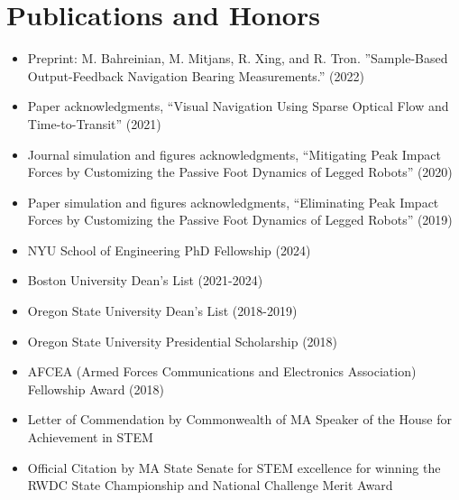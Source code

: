 \documentclass[letterpaper,11pt]{article}
\begin{document}
\section{Publications and Honors}
\begin{itemize}[leftmargin=0.15in, label={}]
  \item Preprint: M. Bahreinian, M. Mitjans, R. Xing, and R. Tron. ”Sample-Based Output-Feedback Navigation Bearing Measurements.” (2022)
  \item Paper acknowledgments, “Visual Navigation Using Sparse Optical Flow and Time-to-Transit” (2021) 
  \item Journal simulation and figures acknowledgments, “Mitigating Peak Impact Forces by Customizing the Passive Foot Dynamics of Legged Robots” (2020) 
  \item Paper simulation and figures acknowledgments, “Eliminating Peak Impact Forces by Customizing the Passive Foot Dynamics of Legged Robots” (2019) 
  \item NYU School of Engineering PhD Fellowship (2024) 
  \item Boston University Dean's List (2021-2024) 
  \item Oregon State University Dean's List (2018-2019) 
  \item Oregon State University Presidential Scholarship (2018) 
  \item AFCEA (Armed Forces Communications and Electronics Association) Fellowship Award (2018) 
  \item Letter of Commendation by Commonwealth of MA Speaker of the House for Achievement in STEM 
  \item Official Citation by MA State Senate for STEM excellence for winning the RWDC State Championship and National Challenge Merit Award
\end{itemize}


\end{document}
